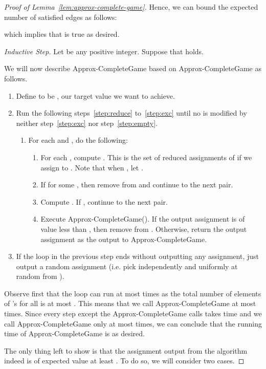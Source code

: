 \documentclass{article}
\begin{document}
\begin{proof}[Proof of Lemma~\ref{lem:approx-complete-game}]
Hence, we can bound the expected number of satisfied edges as follows:

which implies that  is true as desired.

{\em Inductive Step.} Let  be any positive integer. Suppose that  holds.

We will now describe {\sc Approx-CompleteGame} based on {\sc Approx-CompleteGame} as follows.

\begin{enumerate}
\item Define  to be , our target value we want to achieve.
\item Run the following steps~\ref{step:reduce} to~\ref{step:exc} until no  is modified by neither step~\ref{step:exc} nor step~\ref{step:empty}.
  \begin{enumerate}
  \item For each  and , do the following:
    \begin{enumerate}
    \item For each , compute . This is the set of reduced assignments of  if we assign  to . Note that when , let . \label{step:reduce}
    \item If  for some , then remove  from  and continue to the next  pair. \label{step:empty}
    \item Compute . If , continue to the next  pair.
    \item Execute {\sc Approx-CompleteGame}(). If the output assignment is of value less than , then remove  from . Otherwise, return the output assignment as the output to {\sc Approx-CompleteGame}. \label{step:exc}
    \end{enumerate}
  \end{enumerate}
\item If the loop in the previous step ends without outputting any assignment, just output a random assignment (i.e. pick  independently and uniformly at random from ). \label{step:random-assignment}
\end{enumerate}

Observe first that the loop can run at most  times as the total number of elements of 's for all  is at most . This means that we call {\sc Approx-CompleteGame} at most  times. Since every step except the {\sc Approx-CompleteGame} calls takes  time and we call {\sc Approx-CompleteGame} only at most  times, we can conclude that the running time of {\sc Approx-CompleteGame} is  as desired.

The only thing left to show is that the assignment output from the algorithm indeed is of expected value at least . To do so, we will consider two cases.


\end{proof}
\end{document}
